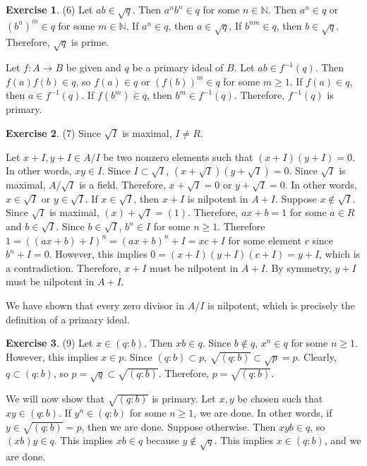 \documentclass[12pt, psamsfonts]{amsart}
\theoremstyle{definition}
\newtheorem*{exer}{Exercise}
\theoremstyle{remark}
\numberwithin{equation}{section}
\begin{document}
\begin{exer}{(6)}
  Let $ab \in \sqrt{q}$.
  Then $a^nb^n \in q$ for some $n \in \mathbb{N}$.
  Then $a^n \in q$ or $(b^n)^m \in q$ for some $m \in \mathbb{N}$.
  If $a^n \in q$, then $a \in \sqrt{q}$.
  If $b^{nm} \in q$, then $b \in \sqrt{q}$.
  Therefore, $\sqrt{q}$ is prime.

  Let $f:A \rightarrow B$ be given and $q$ be a primary ideal of $B$.
  Let $ab \in f^{-1}(q)$.
  Then $f(a)f(b) \in q$, so $f(a) \in q$ or $(f(b))^m \in q$ for some $m \geq 1$.
  If $f(a) \in q$, then $a \in f^{-1}(q)$.
  If $f(b^m) \in q$, then $b^m \in f^{-1}(q)$.
  Therefore, $f^{-1}(q)$ is primary.
\end{exer}

\begin{exer}{(7)}
  Since $\sqrt{I}$ is maximal, $I \ne R$.

  Let $x + I, y + I \in A / I$ be two nonzero elements such that $(x + I)(y + I) = 0$.
  In other words, $xy \in I$.
  Since $I \subset \sqrt{I}$, $(x + \sqrt{I})(y + \sqrt{I}) = 0$.
  Since $\sqrt{I}$ is maximal, $A / \sqrt{I}$ is a field.
  Therefore, $x + \sqrt{I} = 0$ or $y + \sqrt{I} = 0$.
  In other words, $x \in \sqrt{I}$ or $y \in \sqrt{I}$.
  If $x \in \sqrt{I}$, then $x + I$ is nilpotent in $A + I$.
  Suppose $x \notin \sqrt{I}$.
  Since $\sqrt{I}$ is maximal, $(x) + \sqrt{I} = (1)$.
  Therefore, $ax + b = 1$ for some $a \in R$ and $b \in \sqrt{I}$.
  Since $b \in \sqrt{I}$, $b^n \in I$ for some $n \geq 1$.
  Therefore $1 = ((ax + b) + I)^n = (ax + b)^n + I = xc + I$ for some element $c$ since $b^n + I = 0$.
  However, this implies $0 = (x + I)(y + I)(c + I) = y + I$, which is a contradiction.
  Therefore, $x + I$ must be nilpotent in $A + I$.
  By symmetry, $y + I$ must be nilpotent in $A + I$.
  
  We have shown that every zero divisor in $A / I$ is nilpotent, which is precisely the definition of a primary ideal.
\end{exer}

\begin{exer}{(9)}
  Let $x \in (q:b)$.
  Then $xb \in q$.
  Since $b \notin q$, $x^n \in q$ for some $n \geq 1$.
  However, this implies $x \in p$.
  Since $(q:b) \subset p$, $\sqrt{(q:b)} \subset \sqrt{p} = p$.
  Clearly, $q \subset (q:b)$, so $p = \sqrt{q} \subset \sqrt{(q:b)}$.
  Therefore, $p = \sqrt{(q:b)}$.

  We will now show that $\sqrt{(q:b)}$ is primary.
  Let $x, y$ be chosen such that $xy \in (q:b)$.
  If $y^n \in (q:b)$ for some $n \geq 1$, we are done.
  In other words, if $y \in \sqrt{(q:b)} = p$, then we are done.
  Suppose otherwise.
  Then $xyb \in q$, so $(xb)y \in q$.
  This implies $xb \in q$ because $y \notin \sqrt{q}$.
  This implies $x \in (q:b)$, and we are done.
\end{exer}
\end{document}

